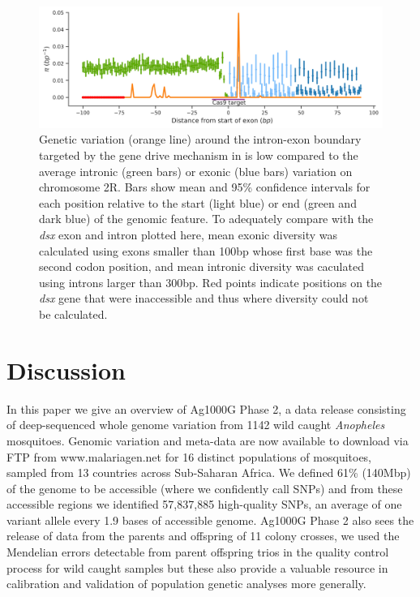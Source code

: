 \documentclass[a4paper,11pt,abstracton,hidelinks]{scrartcl}
\begin{document}
\begin{figure}[H]
	\begin{center}
		\includegraphics*[width=5.5in]{artwork/temp-cas9dsx/Cas9_target_diversity.jpg}
	\end{center}
	\caption{Genetic variation (orange line) around the intron-exon boundary targeted by the gene drive mechanism in \textcite{kyrou2018} is low compared to the average intronic (green bars) or exonic (blue bars) variation on chromosome 2R. Bars show mean and 95\% confidence intervals for each position relative to the start (light blue) or end (green and dark blue) of the genomic feature. To adequately compare with the \textit{dsx} exon and intron plotted here, mean exonic diversity was calculated using exons smaller than 100bp whose first base was the second codon position, and mean intronic diversity was caculated using introns larger than 300bp. Red points indicate positions on the \textit{dsx} gene that were inaccessible and thus where diversity could not be calculated.}
	\label{dsx1}
\end{figure}



\section*{Discussion}


In this paper we give an overview of Ag1000G Phase 2, a data release consisting of deep-sequenced whole genome variation from 1142 wild caught \emph{Anopheles} mosquitoes.
%
Genomic variation and meta-data are now available to download via FTP from www.malariagen.net for 16 distinct populations of mosquitoes, sampled from 13 countries across Sub-Saharan Africa. 
%
We defined 61\% (140Mbp) of the genome to be accessible (where we confidently call SNPs) and from these accessible regions we identified 57,837,885 high-quality SNPs, an average of one variant allele every 1.9 bases of accessible genome.
%
Ag1000G Phase 2 also sees the release of data from the parents and offspring of 11 colony crosses, we used the Mendelian errors detectable from parent offspring trios in the quality control process for wild caught samples but these also provide a valuable resource in calibration and validation of population genetic analyses more generally.
\end{document}
